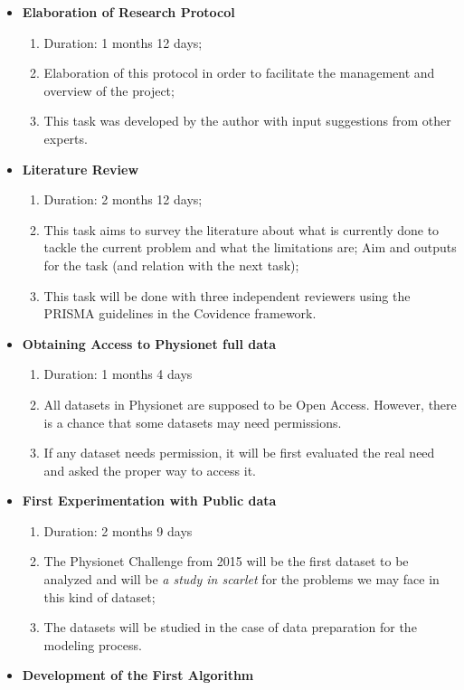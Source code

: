 \documentclass[runningheads]{llncs}
\providecommand{\tightlist}{%
  \setlength{\itemsep}{0pt}\setlength{\parskip}{0pt}}
\begin{document}
\begin{itemize}
\item
  \textbf{Elaboration of Research Protocol}

  \begin{enumerate}
  \def\labelenumi{\arabic{enumi}.}
  \tightlist
  \item
    Duration: 1 months 12 days;
  \item
    Elaboration of this protocol in order to facilitate the management
    and overview of the project;
  \item
    This task was developed by the author with input suggestions from
    other experts.
  \end{enumerate}
\item
  \textbf{Literature Review}

  \begin{enumerate}
  \def\labelenumi{\arabic{enumi}.}
  \tightlist
  \item
    Duration: 2 months 12 days;
  \item
    This task aims to survey the literature about what is currently done
    to tackle the current problem and what the limitations are; Aim and
    outputs for the task (and relation with the next task);
  \item
    This task will be done with three independent reviewers using the
    PRISMA guidelines in the Covidence framework.
  \end{enumerate}
\item
  \textbf{Obtaining Access to Physionet full data}

  \begin{enumerate}
  \def\labelenumi{\arabic{enumi}.}
  \tightlist
  \item
    Duration: 1 months 4 days
  \item
    All datasets in Physionet are supposed to be Open Access. However,
    there is a chance that some datasets may need permissions.
  \item
    If any dataset needs permission, it will be first evaluated the real
    need and asked the proper way to access it.
  \end{enumerate}
\item
  \textbf{First Experimentation with Public data}

  \begin{enumerate}
  \def\labelenumi{\arabic{enumi}.}
  \tightlist
  \item
    Duration: 2 months 9 days
  \item
    The Physionet Challenge from 2015 will be the first dataset to be
    analyzed and will be \emph{a study in scarlet} for the problems we
    may face in this kind of dataset;
  \item
    The datasets will be studied in the case of data preparation for the
    modeling process.
  \end{enumerate}
\item
  \textbf{Development of the First Algorithm}


\end{itemize}
\end{document}
